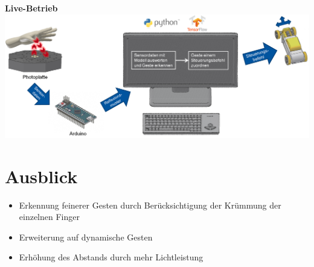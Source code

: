 \documentclass{sciposter}
\begin{document}
\begin{multicols}{3}
\vfill

\textbf{Live-Betrieb}\\
\vspace{1.0cm}
\includegraphics[scale=0.7]{../figures/LiveBetrieb.png}



\section{Ausblick}
\noindent

\begin{itemize}
	\item Erkennung feinerer Gesten durch Berücksichtigung der Krümmung der einzelnen Finger
	\item Erweiterung auf dynamische Gesten
	\item Erhöhung des Abstands durch mehr Lichtleistung
\end{itemize}


\end{multicols}
\end{document}
